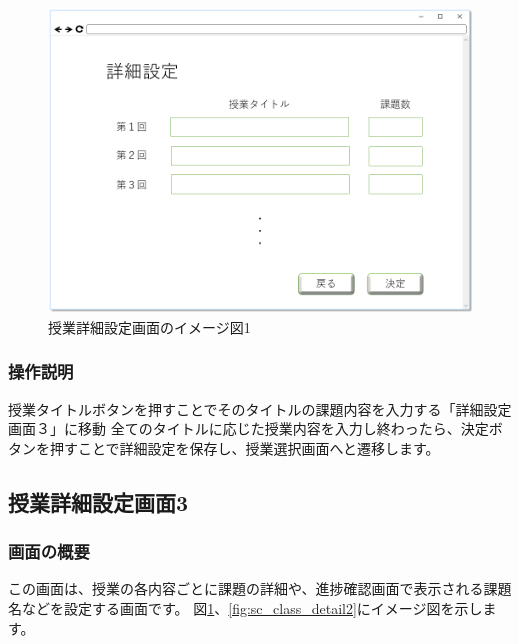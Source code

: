 \begin{figure}[htbp]
\begin{center}
  \includegraphics[width=1\linewidth,clip]{./img/sc_class_detail1.png}
  \caption{授業詳細設定画面のイメージ図1}\label{fig:sc_class_detail1}
\end{center}
\end{figure}

\subsubsection{操作説明}
授業タイトルボタンを押すことでそのタイトルの課題内容を入力する「詳細設定画面３」に移動
全てのタイトルに応じた授業内容を入力し終わったら、決定ボタンを押すことで詳細設定を保存し、授業選択画面へと遷移します。

\newpage

\subsection{授業詳細設定画面3}
\subsubsection{画面の概要}
この画面は、授業の各内容ごとに課題の詳細や、進捗確認画面で表示される課題名などを設定する画面です。
図\ref{fig:sc_class_detail1}、\ref{fig:sc_class_detail2}にイメージ図を示します。

